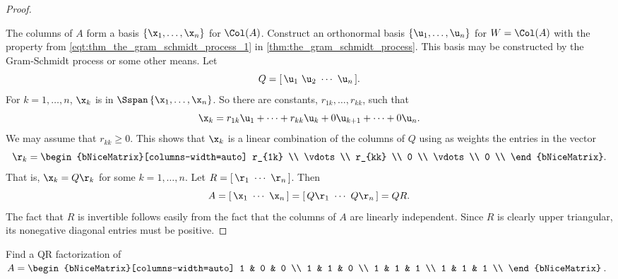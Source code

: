 \begin{proof}
  \label{prf:qr_factorization}

  The columns of $A$ form a basis $\left\{\x_1, \dots, \x_n\right\}$ for
  $\Col(A)$. Construct an orthonormal basis $\left\{\u_1, \dots, \u_n\right\}$
  for $W = \Col(A)$ with the property from
  \cref{eqt:thm_the_gram_schmidt_process_1} in
  \cref{thm:the_gram_schmidt_process}. This basis may be constructed by the
  Gram-Schmidt process or some other means. Let
  \[%
    Q = [\,\u_1~\u_2~\cdots~\u_n\,]
  .\]%
  For $k = 1, \dots, n$, $\x_k$ is in $\Sspan\left\{\x_1, \dots, \x_n\right\}$.
  So there are constants, $r_{1k}, \dots, r_{kk}$, such that
  \[%
    \x_k = r_{1k}\u_1 + \cdots + r_{kk}\u_k + 0\u_{k+1} + \cdots + 0\u_n
  .\]%
  We may assume that $r_{kk} \ge 0$. This shows that $\x_k$ is a linear
  combination of the columns of $Q$ using as weights the entries in the vector
  \[%
    \r_k = \begin{bNiceMatrix}[columns-width=auto]
      r_{1k} \\
      \vdots \\
      r_{kk} \\
      0 \\
      \vdots \\
      0 \\
    \end{bNiceMatrix}
  .\]%
  That is, $\x_k = Q\r_k$ for some $k = 1, \dots, n$. Let $R =
  [\,\r_1~\cdots~\r_n\,]$. Then
  \[%
    A = [\,\x_1~\cdots~\x_n\,] = [\,Q\r_1~\cdots~Q\r_n\,] = QR
  .\]%
  The fact that $R$ is invertible follows easily from the fact that the columns
  of $A$ are linearly independent. Since $R$ is clearly upper triangular, its
  nonegative diagonal entries must be positive.
\end{proof}

\begin{question}
  \label{qst:qr_factorization}

  Find a QR factorization of $A =
  \begin{bNiceMatrix}[columns-width=auto]
    1 & 0 & 0 \\
    1 & 1 & 0 \\
    1 & 1 & 1 \\
    1 & 1 & 1 \\
  \end{bNiceMatrix}$.
\end{question}


